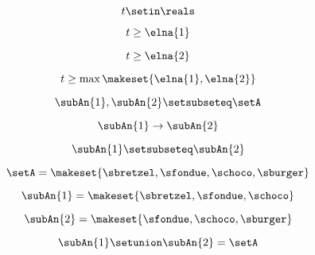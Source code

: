 {\begin{forslides}
    \begin{equation}
        \label{eq:feedback-064}
        t \setin \reals
    \end{equation}

    \begin{equation}
        \label{eq:feedback-065}
        t \geq \elna{1}
    \end{equation}

    \begin{equation}
        \label{eq:feedback-066}
        t \geq \elna{2}
    \end{equation}

    \begin{equation}
        \label{eq:feedback-067}
        t \geq \max \makeset{ \elna{1}, \elna{2} }
    \end{equation}

    \begin{equation}
        \label{eq:feedback-068}
        \subAn{1}, \subAn{2} \setsubseteq \setA
    \end{equation}

    \begin{equation}
        \label{eq:feedback-069}
        \subAn{1} \to \subAn{2}
    \end{equation}

    \begin{equation}
        \label{eq:feedback-070}
        \subAn{1} \setsubseteq \subAn{2}
    \end{equation}

    \begin{equation}
        \label{eq:feedback-071}
        \setA = \makeset{ \sbretzel, \sfondue, \schoco, \sburger }
    \end{equation}

    \begin{equation}
        \label{eq:feedback-071b}
        \subAn{1} = \makeset{ \sbretzel, \sfondue, \schoco }
    \end{equation}

    \begin{equation}
        \label{eq:feedback-072}
        \subAn{2} = \makeset{\sfondue, \schoco, \sburger }
    \end{equation}

    \begin{equation}
        \label{eq:feedback-073}
        \subAn{1} \setunion \subAn{2} = \setA
    \end{equation}


\end{forslides}}
